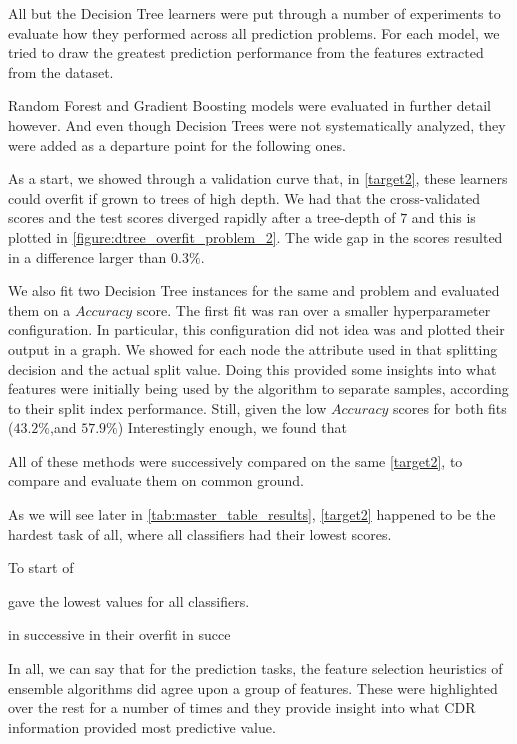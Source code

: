 All but the Decision Tree learners were put through a number of experiments to evaluate how they performed across all prediction problems.
For each model, we tried to draw the greatest prediction performance from the features extracted from the dataset.

Random Forest and Gradient Boosting models were evaluated in further detail however.
And even though Decision Trees were not systematically analyzed, they were added as a departure point for the following ones.

As a start, we showed through a validation curve that, in \cref{target2}, these learners could overfit if grown to trees of high depth.
We had that the cross-validated scores and the test scores diverged rapidly after a tree-depth of $7$ and this is plotted in \cref{figure:dtree_overfit_problem_2}.
The wide gap in the scores resulted in a difference larger than $0.3\%$.

We also fit two Decision Tree instances for the same and problem and evaluated them on a $Accuracy$ score.
The first fit was ran over a smaller hyperparameter configuration.
In particular, this configuration did not
idea was
 and plotted their output in a graph.
We showed for each node the attribute used in that splitting decision and the actual split value.
Doing this provided some insights into what features were initially being used by the algorithm to separate samples, according to their split index performance.
Still, given the low $Accuracy$ scores for both fits ($43.2\%$,and $57.9\%$)
Interestingly enough, we found that



All of these methods were successively compared on the same \cref{target2}, to compare and evaluate them on common ground.

As we will see later in \cref{tab:master_table_results}, \cref{target2} happened to be the hardest task of all, where all classifiers had their lowest scores.

To start of


 gave the lowest values for all classifiers.

in successive
in their overfit
 in succe








In all, we can say that for the prediction tasks, the feature selection heuristics of ensemble algorithms did agree upon a group of features.
These were highlighted over the rest for a number of times and they provide insight into what CDR information provided most
predictive value.

